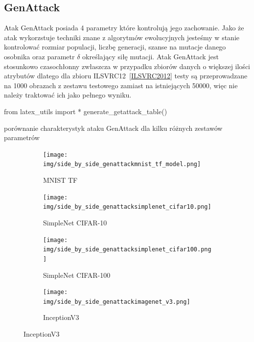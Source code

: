 \documentclass[
    left=2.5cm,         %
    right=2.5cm,        %
    top=2.5cm,          %
    bottom=3cm,         %
    bindingoffset=6mm,  %
    nohyphenation=false %
]{eiti/eiti-thesis}
\begin{document}
\subsection{GenAttack}
Atak GenAttack posiada 4 parametry które kontrolują jego zachowanie. Jako że atak wykorzstuje techniki
znane z algorytmów ewolucyjnych jesteśmy w stanie kontrolować rozmiar populacji, liczbę generacji, szanse na mutacje
danego osobnika oraz parametr \(\delta\) określający siłę mutacji. Atak GenAttack jest stosunkowo czasochłonny zwłaszcza
w przypadku zbiorów danych o większej ilości atrybutów dlatego dla zbioru ILSVRC12~\ref{ILSVRC2012} testy są przeprowadzane
na 1000 obrazach z zestawu testowego zamiast na istniejących 50000, więc nie należy traktować ich jako pełnego wyniku.

\begin{table}[h]
\begin{adjustbox}{max width=\textwidth}
\begin{pycode}
from latex_utils import *
generate_getattack_table()
\end{pycode}
\end{adjustbox}
\caption{porównanie charakterystyk ataku GenAttack dla kilku różnych zestawów parametrów}
\end{table}

\begin{figure}[H]
    \caption{Przykłady wygenerowanych złośliwych przykładów z zadaną klasą za pomocą metody GenAttack}

    \begin{subfigure}[t]{0.48\textwidth}
        \texttt{[image: img/side\_by\_side\_genattackmnist\_tf\_model.png]}
        \caption{MNIST TF}
        \label{fig:mnist_side_genattack}
    \end{subfigure}%
    \hfill
    \begin{subfigure}[t]{0.48\textwidth}
        \texttt{[image: img/side\_by\_side\_genattacksimplenet\_cifar10.png]}
        \caption{SimpleNet CIFAR-10}
        \label{fig:cifar10_side_genattack}
    \end{subfigure}%

    \begin{subfigure}[t]{0.48\textwidth}
        \texttt{[image: img/side\_by\_side\_genattacksimplenet\_cifar100.png]}
        \caption{SimpleNet CIFAR-100}
        \label{fig:cifar100_side_genattack}
    \end{subfigure}%
    \hfill
    \begin{subfigure}[t]{0.48\textwidth}
        \texttt{[image: img/side\_by\_side\_genattackimagenet\_v3.png]}
        \caption{InceptionV3}
        \label{fig:imagenet_side_genattack}
    \end{subfigure}%

\end{figure}
\end{document}
